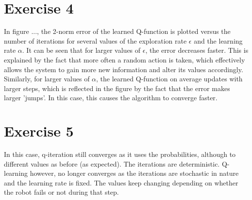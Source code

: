 \documentclass [a4paper] {report}
\begin{document}
	\section*{Exercise 4}
	In figure ..., the 2-norm error of the learned Q-function is plotted versus the number of iterations for several values of the exploration rate $\epsilon$ and the learning rate $\alpha$. It can be seen that for larger values of $\epsilon$, the error decreases faster. This is explained by the fact that more often a random action is taken, which effectively allows the system to gain more new information and alter its values accordingly. Similarly, for larger values of $\alpha$, the learned Q-function on average updates with larger steps, which is reflected in the figure by the fact that the error makes larger 'jumps'. In this case, this causes the algorithm to converge faster.
	
	\section*{Exercise 5}
	In this case, q-iteration still converges as it uses the probabilities, although to different values as before (as expected). The iterations are deterministic. Q-learning however, no longer converges as the iterations are stochastic in nature and the learning rate is fixed. The values keep changing depending on whether the robot fails or not during that step. 
\end{document}
